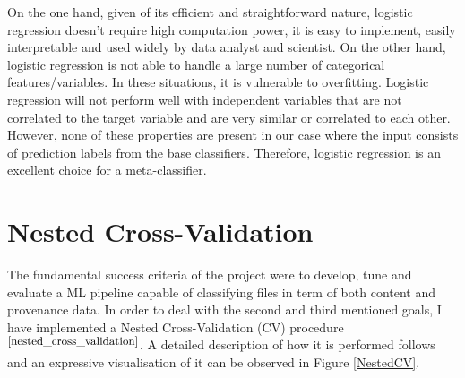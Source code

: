 On the one hand, given of its efficient and straightforward nature, logistic regression doesn't require high computation power, it is easy to implement, easily interpretable and used widely by data analyst and scientist. On the other hand, logistic regression is not able to handle a large number of categorical features/variables. In these situations, it is vulnerable to overfitting. Logistic regression will not perform well with independent variables that are not correlated to the target variable and are very similar or correlated to each other. However, none of these properties are present in our case where the input consists of prediction labels from the base classifiers. Therefore, logistic regression is an excellent choice for a meta-classifier. \\

\section{Nested Cross-Validation} \label{nested_cross_validation}

The fundamental success criteria of the project were to develop, tune and evaluate a ML pipeline capable of classifying files in term of both content and provenance data. In order to deal with the second and third mentioned goals, I have implemented a Nested Cross-Validation (CV) procedure$^{\small \cite{nested_cross_validation}}$. A detailed description of how it is performed follows and an expressive visualisation of it can be observed in Figure \ref{NestedCV}. \bigskip

